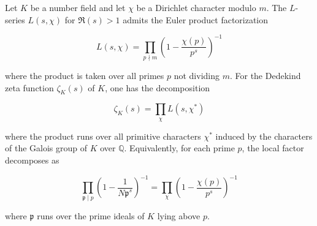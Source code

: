 Let $K$ be a number field and let $\chi$ be a Dirichlet character modulo $m$. The $L$-series $L(s,\chi)$ for $\Re(s) > 1$ admits the Euler product factorization

$$L(s,\chi) = \prod_{p \nmid m} \left(1 - \frac{\chi(p)}{p^s}\right)^{-1}$$

where the product is taken over all primes $p$ not dividing $m$. For the Dedekind zeta function $\zeta_K(s)$ of $K$, one has the decomposition

$$\zeta_K(s) = \prod_{\chi} L(s,\chi^*)$$

where the product runs over all primitive characters $\chi^*$ induced by the characters of the Galois group of $K$ over $\mathbb{Q}$. Equivalently, for each prime $p$, the local factor decomposes as

$$\prod_{\mathfrak{p} \mid p} \left(1 - \frac{1}{N\mathfrak{p}^s}\right)^{-1} = \prod_{\chi} \left(1 - \frac{\chi(p)}{p^s}\right)^{-1}$$

where $\mathfrak{p}$ runs over the prime ideals of $K$ lying above $p$.
